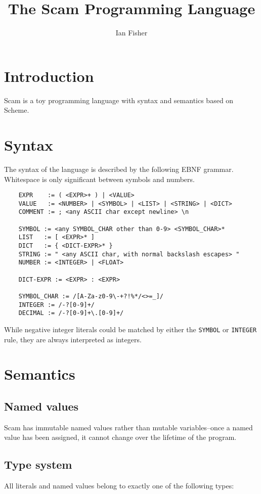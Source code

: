 \documentclass{article}
\newcommand{\inlinecode}{\texttt}
\begin{document}
\title{The Scam Programming Language}
\author{Ian Fisher}
\date{}
\maketitle

\section{Introduction}
Scam is a toy programming language with syntax and semantics based on Scheme.

\section{Syntax}
The syntax of the language is described by the following EBNF grammar. Whitespace is only significant between symbols and numbers.

\begin{verbatim}
    EXPR    := ( <EXPR>+ ) | <VALUE>
    VALUE   := <NUMBER> | <SYMBOL> | <LIST> | <STRING> | <DICT>
    COMMENT := ; <any ASCII char except newline> \n

    SYMBOL := <any SYMBOL_CHAR other than 0-9> <SYMBOL_CHAR>*
    LIST   := [ <EXPR>* ]
    DICT   := { <DICT-EXPR>* }
    STRING := " <any ASCII char, with normal backslash escapes> "
    NUMBER := <INTEGER> | <FLOAT>

    DICT-EXPR := <EXPR> : <EXPR>

    SYMBOL_CHAR := /[A-Za-z0-9\-+?!%*/<>=_]/
    INTEGER := /-?[0-9]+/
    DECIMAL := /-?[0-9]+\.[0-9]+/
\end{verbatim}

While negative integer literals could be matched by either the \inlinecode{SYMBOL} or \inlinecode{INTEGER} rule, they are always interpreted as integers.

\section{Semantics}
\subsection{Named values}
Scam has immutable named values rather than mutable variables--once a named value has been assigned, it cannot change over the lifetime of the program.

\subsection{Type system}
All literals and named values belong to exactly one of the following types:
\end{document}

